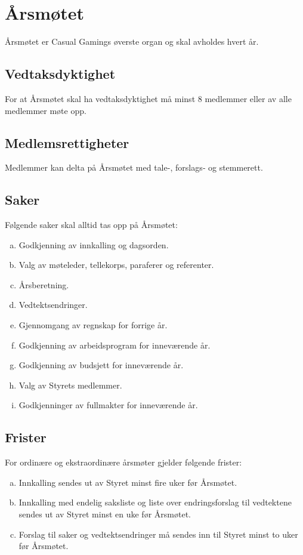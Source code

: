\chapter{Årsmøtet}
Årsmøtet er Casual Gamings øverste organ og skal avholdes hvert år.

\section{Vedtaksdyktighet}
For at Årsmøtet skal ha vedtaksdyktighet må minst 8 medlemmer eller  av alle medlemmer møte opp.

\section{Medlemsrettigheter}
Medlemmer kan delta på Årsmøtet med tale-, forslags‐ og stemmerett.

\section{Saker}
Følgende saker skal alltid tas opp på Årsmøtet:
\begin{enumerate}[a.]
    \item Godkjenning av innkalling og dagsorden.
    \item Valg av møteleder, tellekorps, paraferer og referenter.
    \item Årsberetning.
    \item Vedtektsendringer.
    \item Gjennomgang av regnskap for forrige år.
    \item Godkjenning av arbeidsprogram for inneværende år.
    \item Godkjenning av budsjett for inneværende år.
    \item Valg av Styrets medlemmer.
    \item Godkjenninger av fullmakter for inneværende år.
\end{enumerate}

\section{Frister}
For ordinære og ekstraordinære årsmøter gjelder følgende frister:
\begin{enumerate}[a.]
    \item Innkalling sendes ut av Styret minst fire uker før Årsmøtet.
    \item Innkalling med endelig saksliste og liste over endringsforslag til vedtektene sendes ut av Styret minst en uke før Årsmøtet.
    \item Forslag til saker og vedtektsendringer må sendes inn til Styret minst to uker før Årsmøtet.    
\end{enumerate}

